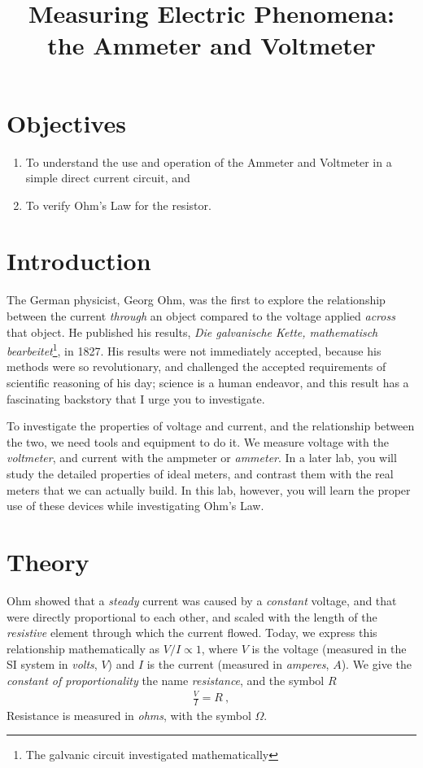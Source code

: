 \documentclass[12pt]{article}
\title{Measuring Electric Phenomena:\\the Ammeter and Voltmeter}
\author{}
\date{}
\begin{document}
\maketitle

\section{Objectives}
\label{sec:objectives}

\begin{enumerate}
\item To understand the use and operation of the Ammeter and
  Voltmeter in a simple direct current circuit, and
\item To verify Ohm's Law for the resistor.
\end{enumerate}

\section{Introduction}
\label{sec:introduction}

The German physicist, Georg Ohm, was the first to explore the
relationship between the current \textit{through} an object compared
to the voltage applied \textit{across} that object.  He published his
results, \textit{Die galvanische Kette, mathematisch
  bearbeitet}\footnote{The galvanic circuit investigated
  mathematically}, in 1827.  His results were not immediately
accepted, because his methods were so revolutionary, and challenged
the accepted requirements of scientific reasoning of his day; science
is a human endeavor, and this result has a fascinating backstory that
I urge you to investigate.

To investigate the properties of voltage and current, and the
relationship between the two, we need tools and equipment to do it.
We measure voltage with the \textit{voltmeter}, and current with the
ampmeter or \textit{ammeter}.  In a later lab, you will study the
detailed properties of ideal meters, and contrast them with the real
meters that we can actually build.  In this lab, however, you will
learn the proper use of these devices while investigating Ohm's Law.

\section{Theory}
\label{sec:theory}

Ohm showed that a \textit{steady} current was caused by a
\textit{constant} voltage, and that were directly proportional to each
other, and scaled with the length of the \textit{resistive} element
through which the current flowed.  Today, we express this relationship
mathematically as $V/I \propto 1$, where $V$ is the voltage (measured
in the SI system in \textit{volts}, $V$) and $I$ is the current
(measured in \textit{amperes}, $A$).  We give the \textit{constant of
  proportionality} the name \textit{resistance}, and the symbol $R$
\begin{gather*}
  \frac{V}{I} = R\ ,
\end{gather*}
Resistance is measured in \textit{ohms}, with the symbol $\Omega$.
\end{document}
